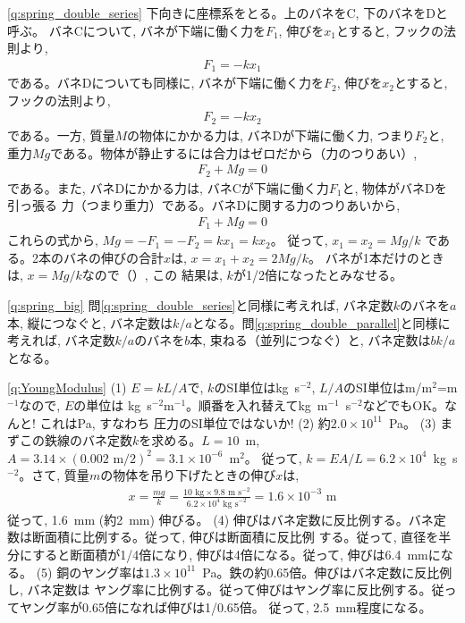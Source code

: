 \ref{q:spring_double_series} 
下向きに座標系をとる。上のバネをC, 下のバネをDと呼ぶ。
バネCについて, バネが下端に働く力を$F_1$, 伸びを$x_1$とすると, フックの法則より, 
\begin{eqnarray}F_1=-kx_1\end{eqnarray}
である。バネDについても同様に, バネが下端に働く力を$F_2$, 伸びを$x_2$とすると, 
フックの法則より, 
\begin{eqnarray}F_2=-kx_2\end{eqnarray}
である。一方, 質量$M$の物体にかかる力は, バネDが下端に働く力, つまり$F_2$と, 
重力$Mg$である。物体が静止するには合力はゼロだから（力のつりあい）, 
\begin{eqnarray}F_2+Mg=0\end{eqnarray}
である。また, バネDにかかる力は, バネCが下端に働く力$F_1$と, 物体がバネDを引っ張る
力（つまり重力）である。バネDに関する力のつりあいから, 
\begin{eqnarray}F_1+Mg=0\end{eqnarray}
これらの式から, 
$Mg=-F_1=-F_2=kx_1=kx_2$。
従って, 
$x_1=x_2=Mg/k$
である。2本のバネの伸びの合計$x$は, 
$x=x_1+x_2=2Mg/k$。
バネが1本だけのときは, $x=Mg/k$なので（）, この
結果は, $k$が1/2倍になったとみなせる。
\vspace{0.2cm}

\ref{q:spring_big} 
問\ref{q:spring_double_series}と同様に考えれば, バネ定数$k$のバネを$a$本, 縦につなぐと, 
バネ定数は$k/a$となる。問\ref{q:spring_double_parallel}と同様に考えれば, バネ定数$k/a$のバネを$b$本, 
束ねる（並列につなぐ）と, バネ定数は$bk/a$となる。
\vspace{0.2cm}

\ref{q:YoungModulus}
(1) $E=kL/A$で, $k$のSI単位はkg~s$^{-2}$, $L/A$のSI単位はm/m$^{2}$=m$^{-1}$なので, $E$の単位は
kg~s$^{-2}$m$^{-1}$。順番を入れ替えてkg~m$^{-1}$~s$^{-2}$などでもOK。なんと! これはPa, すなわち
圧力のSI単位ではないか!
(2) 約$2.0\times10^{11}$~Pa。
(3) まずこの鉄線のバネ定数$k$を求める。$L=10$~m, $A=3.14\times(0.002\text{ m}/2)^2=3.1\times 10^{-6}$~m$^2$。
従って, $k=EA/L=6.2\times10^{4}$~kg~s$^{-2}$。さて, 質量$m$の物体を吊り下げたときの伸び$x$は, 
\begin{eqnarray*}x=\frac{mg}{k}=\frac{10\text{ kg}\times9.8\text{ m s}^{-2}}{6.2\times10^4\text{ kg s}^{-2}}=1.6\times10^{-3}\text{ m}\end{eqnarray*}
従って, 1.6~mm (約2~mm) 伸びる。
(4) 伸びはバネ定数に反比例する。バネ定数は断面積に比例する。従って, 伸びは断面積に反比例
する。従って, 直径を半分にすると断面積が1/4倍になり, 伸びは4倍になる。従って, 伸びは6.4~mmになる。
(5) 銅のヤング率は$1.3\times 10^{11}$~Pa。鉄の約0.65倍。伸びはバネ定数に反比例し, バネ定数は
ヤング率に比例する。従って伸びはヤング率に反比例する。従ってヤング率が0.65倍になれば伸びは1/0.65倍。
従って, 2.5~mm程度になる。
\mv


